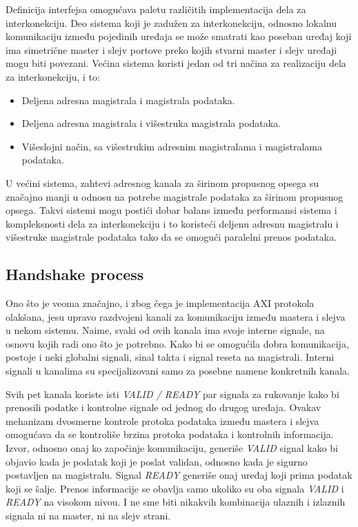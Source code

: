 \documentclass[a4paper, 12pt, diplomski]{etf}
\begin{document}
	Definicija interfejsa omogućava paletu različitih implementacija dela za interkonekciju. Deo sistema koji je zadužen za interkonekciju, odnosno lokalnu komunikaciju između pojedinih uređaja se može smatrati kao poseban uređaj koji ima simetrične master i slejv portove preko kojih stvarni master i slejv uređaji mogu biti povezani.
	Većina sistema koristi jedan od tri načina za realizaciju dela za interkonekciju, i to:

	\begin{itemize}

		\item Deljena adresna magistrala i magistrala podataka.
		\item Deljena adresna magistrala i višestruka magistrala podataka.
		\item Višeslojni način, sa višestrukim adresnim magistralama i magistralama podataka.

	\end{itemize}

	U većini sistema, zahtevi adresnog kanala za širinom propusnog opsega su značajno manji u odnosu na potrebe magistrale podataka za širinom propusnog opsega. Takvi sistemi mogu postići dobar balans između performansi sistema i kompleksnosti dela za interkonekciju i to koristeći deljenu adresnu magistralu i višestruke magistrale podataka tako da se omogući paralelni prenos podataka.

	\subsection{Handshake process}

	Ono što je veoma značajno, i zbog čega je implementacija AXI protokola olakšana, jesu upravo razdvojeni kanali za komunikaciju između mastera i slejva u nekom sistemu. Naime, svaki od ovih kanala ima svoje interne signa\-le, na osnovu kojih radi ono što je potrebno. Kako bi se omogućila dobra komunikacija, postoje i neki globalni signali, sinal takta i signal reseta na magistrali. Interni signali u kanalima su specijalizovani samo za posebne namene konkretnih kanala.

	Svih pet kanala koriste isti \textit{VALID / READY} par signala za rukovanje kako bi prenosili podatke i kontrolne signale od jednog do drugog uređaja. Ovakav mehanizam dvosmerne kontrole protoka podataka između mastera i slejva omogućava da se kontroliše brzina protoka podataka i kontrolnih informacija. Izvor, odnosno onaj ko započinje komunikaciju, generiše \textit{VALID} signal kako bi objavio kada je podatak koji je poslat validan, odnosno kada je sigurno postavljen na magistralu. Signal \textit{READY} generiše onaj uređaj koji prima podatak koji se šalje. Prenos informacije se obavlja samo ukoliko su oba signala \textit{VALID} i \textit{READY} na visokom nivou. I ne sme biti nikakvih kombinacija ulaznih i izlaznih signala ni na master, ni na slejv strani.
\end{document}
